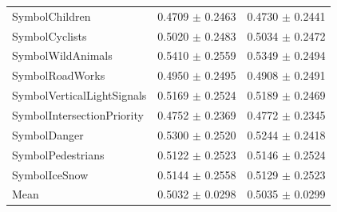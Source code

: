 \begin{longtable}{@{}lrr@{}}
SymbolChildren & 0.4709 $\pm$ 0.2463 & 0.4730 $\pm$ 0.2441 \\
SymbolCyclists & 0.5020 $\pm$ 0.2483 & 0.5034 $\pm$ 0.2472 \\
SymbolWildAnimals & 0.5410 $\pm$ 0.2559 & 0.5349 $\pm$ 0.2494 \\
SymbolRoadWorks & 0.4950 $\pm$ 0.2495 & 0.4908 $\pm$ 0.2491 \\
SymbolVerticalLightSignals & 0.5169 $\pm$ 0.2524 & 0.5189 $\pm$ 0.2469 \\
SymbolIntersectionPriority & 0.4752 $\pm$ 0.2369 & 0.4772 $\pm$ 0.2345 \\
SymbolDanger & 0.5300 $\pm$ 0.2520 & 0.5244 $\pm$ 0.2418 \\
SymbolPedestrians & 0.5122 $\pm$ 0.2523 & 0.5146 $\pm$ 0.2524 \\
SymbolIceSnow & 0.5144 $\pm$ 0.2558 & 0.5129 $\pm$ 0.2523 \\
Mean & 0.5032 $\pm$ 0.0298 & 0.5035 $\pm$ 0.0299 \\
\end{longtable}
